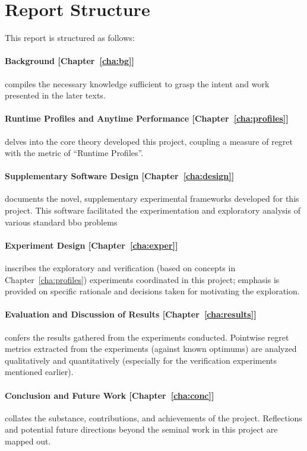 \newpage
\section{Report Structure}
This report is structured as follows:
\paragraph{Background [Chapter~\ref{cha:bg}]} compiles the necessary
knowledge sufficient to grasp the intent and work presented in the later texts.
\paragraph{Runtime Profiles and Anytime Performance
[Chapter~\ref{cha:profiles}]} delves into the core theory developed
this project, coupling a measure of regret with the metric of
``Runtime Profiles''.
\paragraph{Supplementary Software Design [Chapter~\ref{cha:design}]}
documents the novel, supplementary experimental frameworks developed
for this project. This software facilitated the experimentation and
exploratory analysis of various standard \acrshort{bbo} problems
\paragraph{Experiment Design [Chapter~\ref{cha:exper}]} inscribes the
exploratory and verification (based on concepts in
Chapter~\ref{cha:profiles}) experiments coordinated in this project;
emphasis is provided on specific rationale and decisions taken for
motivating the exploration.
\paragraph{Evaluation and Discussion of Results
[Chapter~\ref{cha:results}]} confers the results gathered from the
experiments conducted. Pointwise regret metrics extracted from the
experiments (against known optimums) are analyzed qualitatively and
quantitatively (especially for the verification experiments mentioned earlier).
\paragraph{Conclusion and Future Work [Chapter~\ref{cha:conc}]}
collates the substance, contributions, and achievements of the
project. Reflections and potential future directions beyond the
seminal work in this project are mapped out.

